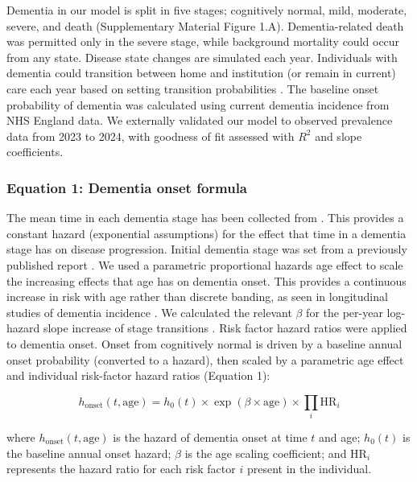 \documentclass[11pt,a4paper]{article}
\begin{document}
Dementia in our model is split in five stages; cognitively normal, mild, moderate, severe, and death (Supplementary Material Figure 1.A). Dementia-related death was permitted only in the severe stage, while background mortality could occur from any state. Disease state changes are simulated each year. Individuals with dementia could transition between home and institution (or remain in current) care each year based on setting transition probabilities \cite{ref26}. The baseline onset probability of dementia was calculated using current dementia incidence from NHS England data. We externally validated our model to observed prevalence data from 2023 to 2024, with goodness of fit assessed with $R^2$ and slope coefficients.

\subsubsection{Equation 1: Dementia onset formula}

The mean time in each dementia stage has been collected from \cite{ref27}. This provides a constant hazard (exponential assumptions) for the effect that time in a dementia stage has on disease progression. Initial dementia stage was set from a previously published report \cite{ref26}. We used a parametric proportional hazards age effect to scale the increasing effects that age has on dementia onset. This provides a continuous increase in risk with age rather than discrete banding, as seen in longitudinal studies of dementia incidence \cite{ref28}. We calculated the relevant $\beta$ for the per-year log-hazard slope increase of stage transitions \cite{ref29,ref30,ref31}. Risk factor hazard ratios were applied to dementia onset. Onset from cognitively normal is driven by a baseline annual onset probability (converted to a hazard), then scaled by a parametric age effect and individual risk-factor hazard ratios (Equation 1):

\begin{equation}
\label{eq:dementia_onset}
h_{\text{onset}}(t, \text{age}) = h_0(t) \times \exp(\beta \times \text{age}) \times \prod_{i} \text{HR}_i
\end{equation}

\noindent where $h_{\text{onset}}(t, \text{age})$ is the hazard of dementia onset at time $t$ and age; $h_0(t)$ is the baseline annual onset hazard; $\beta$ is the age scaling coefficient; and $\text{HR}_i$ represents the hazard ratio for each risk factor $i$ present in the individual.
\end{document}
